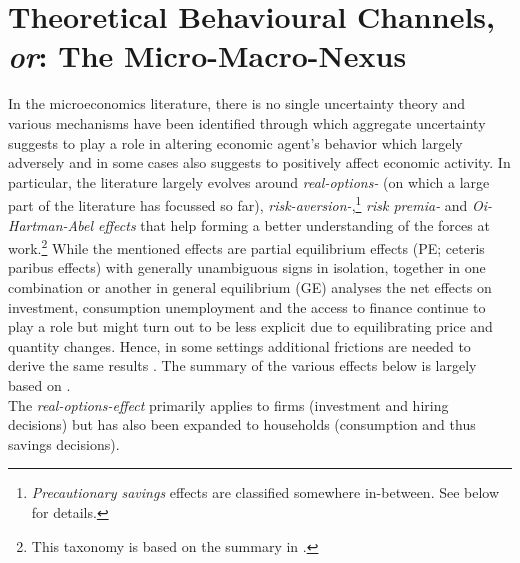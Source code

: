 \documentclass[a4paper,11pt,listof=nochaptergap,oneside,pointednumbers,bibtotoc,bigheadings,liststotoc,hidelinks]{scrbook}
\theoremstyle{mysatz}
\theoremstyle{mydefinition}
\theoremstyle{mytheorem}
\theoremstyle{mybemerkung}
\begin{document}
\section[Theoretical Behavioural Channels, \textit{or}: The Micro-Macro-Nexus]{Theoretical Behavioural Channels, \textit{or}: The Micro-Macro-Nexus}
\label{sec:studiedeffectsinrelatedliterature}

In the microeconomics literature, there is no single uncertainty theory and various mechanisms have been identified through which aggregate uncertainty suggests to play a role in altering economic agent's behavior which largely adversely and in some cases also suggests to positively affect economic activity. In particular, the literature largely evolves around \textit{real-options-} (on which a large part of the literature has focussed so far), \textit{risk-aversion-},\footnote{\textit{Precautionary savings} effects are classified somewhere in-between. See below for details.} \textit{risk premia-} and \textit{Oi-Hartman-Abel effects} that help forming a better understanding of the forces at work.\footnote{This taxonomy is based on the summary in \citet{bloom:14}.} While the mentioned effects are partial equilibrium effects (PE; ceteris paribus effects) with generally unambiguous signs in isolation, together in one combination or another in general equilibrium (GE) analyses the net effects on investment, consumption unemployment and the access to finance continue to play a role but might turn out to be less explicit due to equilibrating price and quantity changes. Hence, in some settings additional frictions are needed to derive the same results \citep{juradoetal:15}. The summary of the various effects below is largely based on \citet{bloom:14}.\\

The \textit{real-options-effect} primarily applies to firms (investment and hiring decisions) but has also been expanded to households (consumption and thus savings decisions). 
\end{document}
